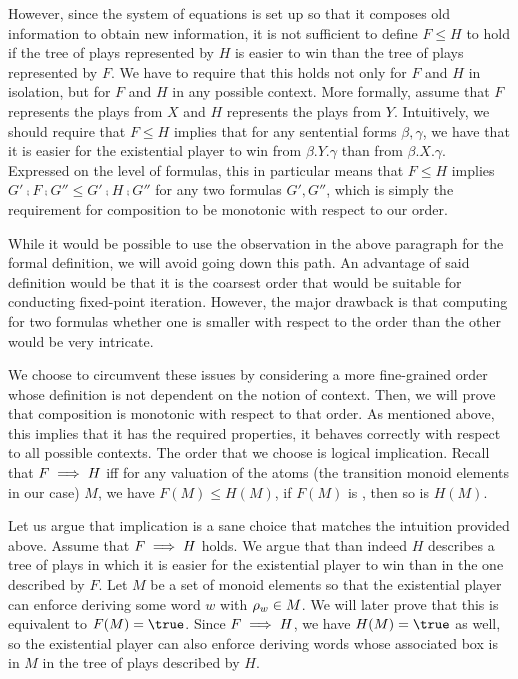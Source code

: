 \documentclass[../../diss.tex]{subfiles}
\begin{document}
However, since the system of equations is set up so that it composes old information to obtain new information, it is not sufficient to define $F \leq H$ to hold if the tree of plays represented by $H$ is easier to win than the tree of plays represented by $F$.
We have to require that this holds not only for $F$ and $H$ in isolation, but for $F$ and $H$ in any possible context.
More formally, assume that $F$ represents the plays from $X$ and $H$ represents the plays from $Y$.
Intuitively, we should require that $F \leq H$ implies that for any sentential forms $\beta,\gamma$, we have that it is easier for the existential player to win from $\beta.Y.\gamma$ than from $\beta.X.\gamma$.
Expressed on the level of formulas, this in particular means that $F \leq H$ implies $G' \comp F \comp G'' \leq G' \comp H \comp G''$ for any two formulas $G',G''$, which is simply the requirement for composition to be monotonic with respect to our order.

While it would be possible to use the observation in the above paragraph for the formal definition, we will avoid going down this path.
An advantage of said definition would be that it is the coarsest order that would be suitable for conducting fixed-point iteration.
However, the major drawback is that computing for two formulas whether one is smaller with respect to the order than the other would be very intricate.

We choose to circumvent these issues by considering a more fine-grained order whose definition is not dependent on the notion of context.
Then, we will prove that composition is monotonic with respect to that order.
As mentioned above, this implies that it has the required properties, \ie it behaves correctly with respect to all possible contexts.
The order that we choose is logical implication.
Recall that $F \implies H$ iff for any valuation of the atoms (the transition monoid elements in our case) $M$, we have $F(M) \leq H(M)$, \ie if $F(M)$ is \true, then so is $H(M)$.

Let us argue that implication is a sane choice that matches the intuition provided above.
Assume that $F \implies H$ holds.
We argue that than indeed $H$ describes a tree of plays in which it is easier for the existential player to win than in the one described by $F$.
Let $M$ be a set of monoid elements so that the existential player can enforce deriving some word $w$ with $\tbox{w} \in M$.
We will later prove that this is equivalent to $F(M) = \true$.
Since $F \implies H$, we have $H(M) = \true$ as well, so the existential player can also enforce deriving words whose associated box is in $M$ in the tree of plays described by $H$.
\end{document}
